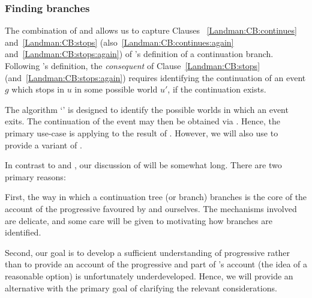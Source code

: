\subsubsection{Finding branches}
\label{cha:fcs:sec:Prog:L:Alg:branches}

\begin{note}
  The combination of \AlgAC{} and \AlgGetStops{} allows us to capture Clauses ~\ref{Landman:CB:continues} and~\ref{Landman:CB:stops} (also~\ref{Landman:CB:continues:again} and~\ref{Landman:CB:stops:again}) of \citeauthor{Landman:1992wh}'s definition of a continuation branch.
  Following \citeauthor{Landman:1992wh}'s definition, the \emph{consequent} of Clause~\ref{Landman:CB:stops} (and~\ref{Landman:CB:stops:again}) requires identifying the continuation of an event \(g\) which stops in \(u\) in some possible world \(u'\), if the continuation exists.

  The algorithm `\AlgFindBranches{}' is designed to identify the possible worlds in which an event exits.
  The continuation of the event may then be obtained via \AlgAC{}.
  Hence, the primary use-case is applying \AlgFindBranches{} to the result of \AlgGetStops{}.
  However, we will also use \AlgFindBranches{} to provide a variant of \AlgGetStops{}.
\end{note}

\begin{note}[Omen]
  In contrast to \AlgAC{} and \AlgGetStops{}, our discussion of \AlgFindBranches{} will be somewhat long.
  There are two primary reasons:

  First, the way in which a continuation tree (or branch) branches is the core of the account of the progressive favoured by \citeauthor{Landman:1992wh} and ourselves.
  The mechanisms involved are delicate, and some care will be given to motivating how branches are identified.

  Second, our goal is to develop a sufficient understanding of progressive rather than to provide an account of the progressive and part of \citeauthor{Landman:1992wh}'s account (the idea of a reasonable option) is unfortunately underdeveloped.
  Hence, we will provide an alternative with the primary goal of clarifying the relevant considerations.
\end{note}

